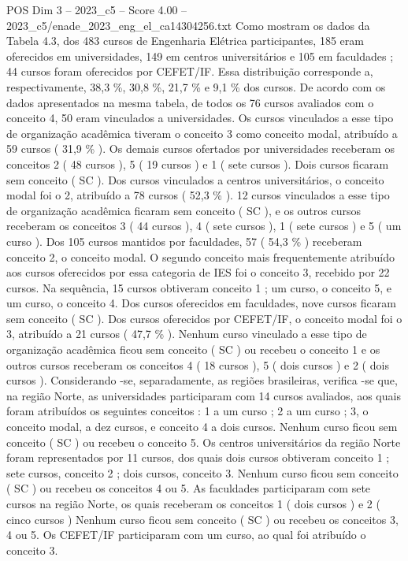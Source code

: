 \begin{textsample}{POS Dim 3 – 2023\_c5 – Score 4.00 – 2023\_c5/enade\_2023\_eng\_el\_ca14304256.txt}
Como mostram os dados da Tabela 4.3, dos 483 cursos de Engenharia Elétrica participantes, 185 eram oferecidos em universidades, 149 em centros universitários e 105 em faculdades ; 44 cursos foram oferecidos por CEFET/IF.
Essa distribuição corresponde a, respectivamente, 38,3 \%, 30,8 \%, 21,7 \% e 9,1 \% dos cursos.
De acordo com os dados apresentados na mesma tabela, de todos os 76 cursos avaliados com o conceito 4, 50 eram vinculados a universidades.
Os cursos vinculados a esse tipo de organização acadêmica tiveram o conceito 3 como conceito modal, atribuído a 59 cursos ( 31,9 \% ).
Os demais cursos ofertados por universidades receberam os conceitos 2 ( 48 cursos ), 5 ( 19 cursos ) e 1 ( sete cursos ).
Dois cursos ficaram sem conceito ( SC ).
Dos cursos vinculados a centros universitários, o conceito modal foi o 2, atribuído a 78 cursos ( 52,3 \% ). 12 cursos vinculados a esse tipo de organização acadêmica ficaram sem conceito ( SC ), e os outros cursos receberam os conceitos 3 ( 44 cursos ), 4 ( sete cursos ), 1 ( sete cursos ) e 5 ( um curso ).
Dos 105 cursos mantidos por faculdades, 57 ( 54,3 \% ) receberam conceito 2, o conceito modal.
O segundo conceito mais frequentemente atribuído aos cursos oferecidos por essa categoria de IES foi o conceito 3, recebido por 22 cursos.
Na sequência, 15 cursos obtiveram conceito 1 ; um curso, o conceito 5, e um curso, o conceito 4.
Dos cursos oferecidos em faculdades, nove cursos ficaram sem conceito ( SC ).
Dos cursos oferecidos por CEFET/IF, o conceito modal foi o 3, atribuído a 21 cursos ( 47,7 \% ).
Nenhum curso vinculado a esse tipo de organização acadêmica ficou sem conceito ( SC ) ou recebeu o conceito 1 e os outros cursos receberam os conceitos 4 ( 18 cursos ), 5 ( dois cursos ) e 2 ( dois cursos ).
Considerando -se, separadamente, as regiões brasileiras, verifica -se que, na região Norte, as universidades participaram com 14 cursos avaliados, aos quais foram atribuídos os seguintes conceitos : 1 a um curso ; 2 a um curso ; 3, o conceito modal, a dez cursos, e conceito 4 a dois cursos.
Nenhum curso ficou sem conceito ( SC ) ou recebeu o conceito 5.
Os centros universitários da região Norte foram representados por 11 cursos, dos quais dois cursos obtiveram conceito 1 ; sete cursos, conceito 2 ; dois cursos, conceito 3.
Nenhum curso ficou sem conceito ( SC ) ou recebeu os conceitos 4 ou 5.
As faculdades participaram com sete cursos na região Norte, os quais receberam os conceitos 1 ( dois cursos ) e 2 ( cinco cursos ) Nenhum curso ficou sem conceito ( SC ) ou recebeu os conceitos 3, 4 ou 5.
Os CEFET/IF participaram com um curso, ao qual foi atribuído o conceito 3.

\end{textsample}
